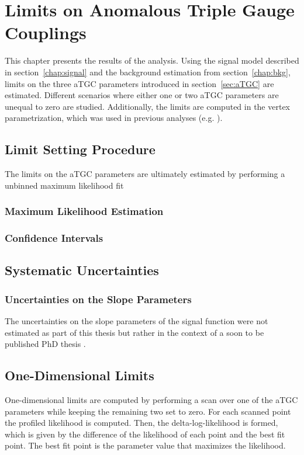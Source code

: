 \chapter{Limits on Anomalous Triple Gauge Couplings}
\label{chap:LimitsonATGCs}
This chapter presents the results of the analysis. Using the signal model described in section~\ref{chap:signal} and the background estimation from section~\ref{chap:bkg}, limits on the three aTGC parameters introduced in section~\ref{sec:aTGC} are estimated. Different scenarios where either one or two aTGC parameters are unequal to zero are studied. Additionally, the limits are computed in the vertex parametrization, which was used in previous analyses (e.g. \cite{aTGC1,aTGC2}).
\section{Limit Setting Procedure}
The limits on the aTGC parameters are ultimately estimated by performing a unbinned maximum likelihood fit
\subsection{Maximum Likelihood Estimation}
\subsection{Confidence Intervals}
\section{Systematic Uncertainties}
\label{sec:systematics}
\subsection{Uncertainties on the Slope Parameters}
\label{sec:uncslopesig}
The uncertainties on the slope parameters of the signal function were not estimated as part of this thesis but rather in the context of a soon to be published PhD thesis \cite{IVAN}.
\section{One-Dimensional Limits}
One-dimensional limits are computed by performing a scan over one of the aTGC parameters while keeping the remaining two set to zero. For each scanned point the profiled likelihood is computed. Then, the delta-log-likelihood is formed, which is given by the difference of the likelihood of each point and the best fit point. The best fit point is the parameter value that maximizes the likelihood.  
